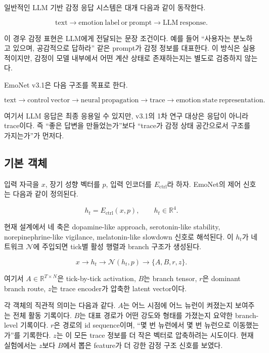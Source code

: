\documentclass[11pt,a4paper]{article}
\begin{document}
일반적인 LLM 기반 감정 응답 시스템은 대개 다음과 같이 동작한다.

\[
\mathrm{text}
\rightarrow
\mathrm{emotion\ label\ or\ prompt}
\rightarrow
\mathrm{LLM\ response}.
\]

이 경우 감정 표현은 LLM에게 전달되는 문장 조건이다. 예를 들어 ``사용자는 분노하고 있으며, 공감적으로 답하라'' 같은 prompt가 감정 정보를 대표한다. 이 방식은 실용적이지만, 감정이 모델 내부에서 어떤 계산 상태로 존재하는지는 별도로 검증하지 않는다.

EmoNet v3.1은 다음 구조를 목표로 한다.

\[
\mathrm{text}
\rightarrow
\mathrm{control\ vector}
\rightarrow
\mathrm{neural\ propagation}
\rightarrow
\mathrm{trace}
\rightarrow
\mathrm{emotion\ state\ representation}.
\]

여기서 LLM 응답은 최종 응용일 수 있지만, v3.1의 1차 연구 대상은 응답이 아니라 trace이다. 즉 ``좋은 답변을 만들었는가''보다 ``trace가 감정 상태 공간으로서 구조를 가지는가''가 먼저다.

\subsection{기본 객체}

입력 자극을 \(x\), 장기 성향 벡터를 \(p\), 입력 인코더를 \(E_{\mathrm{ctrl}}\)라 하자. EmoNet의 제어 신호는 다음과 같이 정의된다.

\[
h_t = E_{\mathrm{ctrl}}(x,p), \qquad h_t \in \mathbb{R}^{4}.
\]

현재 설계에서 네 축은 dopamine-like approach, serotonin-like stability, norepinephrine-like vigilance, melatonin-like slowdown 신호로 해석된다. 이 \(h_t\)가 네트워크 \(\mathcal{N}\)에 주입되면 tick별 활성 행렬과 branch 구조가 생성된다.

\[
x \rightarrow h_t \rightarrow \mathcal{N}(h_t,p) \rightarrow
\{A, B, r, z\}.
\]

여기서 \(A \in \mathbb{R}^{T \times N}\)은 tick-by-tick activation, \(B\)는 branch tensor, \(r\)은 dominant branch route, \(z\)는 trace encoder가 압축한 latent vector이다.

각 객체의 직관적 의미는 다음과 같다. \(A\)는 어느 시점에 어느 뉴런이 켜졌는지 보여주는 전체 활동 기록이다. \(B\)는 대표 경로가 어떤 강도와 형태를 가졌는지 요약한 branch-level 기록이다. \(r\)은 경로의 id sequence이며, ``몇 번 뉴런에서 몇 번 뉴런으로 이동했는가''를 기록한다. \(z\)는 이 모든 trace 정보를 더 작은 벡터로 압축하려는 시도이다. 현재 실험에서는 \(z\)보다 \(B\)에서 뽑은 feature가 더 강한 감정 구조 신호를 보였다.
\end{document}
